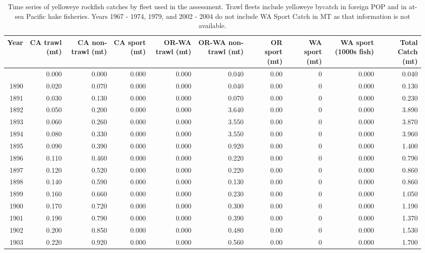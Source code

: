 \documentclass[
]{scrartcl}
\begin{document}
\begin{landscape}

\begingroup
\fontsize{9.0pt}{10.8pt}\selectfont

\begin{longtable}{rrrrrrrrrr}

\caption{\label{tbl-all_removals}Time series of yelloweye rockfish
catches by fleet used in the assessment. Trawl fleets include yelloweye
bycatch in foreign POP and in at-sea Pacific hake fisheries. Years 1967
- 1974, 1979, and 2002 - 2004 do not include WA Sport Catch in MT as
that information is not available.}

\tabularnewline

\toprule
Year & CA trawl (mt) & CA non-trawl (mt) & CA sport (mt) & OR-WA trawl (mt) & OR-WA non-trawl (mt) & OR sport (mt) & WA sport (mt) & WA sport (1000s fish) & Total Catch (mt) \\ 
\midrule\addlinespace[2.5pt]
1889 & 0.000 & 0.000 & 0.000 & 0.000 & 0.040 & 0.00 & 0 & 0.000 & 0.040 \\ 
1890 & 0.020 & 0.070 & 0.000 & 0.000 & 0.040 & 0.00 & 0 & 0.000 & 0.130 \\ 
1891 & 0.030 & 0.130 & 0.000 & 0.000 & 0.070 & 0.00 & 0 & 0.000 & 0.230 \\ 
1892 & 0.050 & 0.200 & 0.000 & 0.000 & 3.640 & 0.00 & 0 & 0.000 & 3.890 \\ 
1893 & 0.060 & 0.260 & 0.000 & 0.000 & 3.550 & 0.00 & 0 & 0.000 & 3.870 \\ 
1894 & 0.080 & 0.330 & 0.000 & 0.000 & 3.550 & 0.00 & 0 & 0.000 & 3.960 \\ 
1895 & 0.090 & 0.390 & 0.000 & 0.000 & 0.920 & 0.00 & 0 & 0.000 & 1.400 \\ 
1896 & 0.110 & 0.460 & 0.000 & 0.000 & 0.220 & 0.00 & 0 & 0.000 & 0.790 \\ 
1897 & 0.120 & 0.520 & 0.000 & 0.000 & 0.220 & 0.00 & 0 & 0.000 & 0.860 \\ 
1898 & 0.140 & 0.590 & 0.000 & 0.000 & 0.130 & 0.00 & 0 & 0.000 & 0.860 \\ 
1899 & 0.160 & 0.660 & 0.000 & 0.000 & 0.230 & 0.00 & 0 & 0.000 & 1.050 \\ 
1900 & 0.170 & 0.720 & 0.000 & 0.000 & 0.300 & 0.00 & 0 & 0.000 & 1.190 \\ 
1901 & 0.190 & 0.790 & 0.000 & 0.000 & 0.390 & 0.00 & 0 & 0.000 & 1.370 \\ 
1902 & 0.200 & 0.850 & 0.000 & 0.000 & 0.480 & 0.00 & 0 & 0.000 & 1.530 \\ 
1903 & 0.220 & 0.920 & 0.000 & 0.000 & 0.560 & 0.00 & 0 & 0.000 & 1.700 \\ 

\end{longtable}
\end{landscape}
\end{document}
